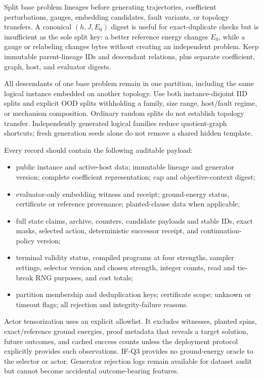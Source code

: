 \documentclass[11pt,a4paper]{article}
\theoremstyle{definition}\newtheorem{definition}[proposition]{Definition}
\begin{document}
Split base problem lineages before generating trajectories, coefficient perturbations, gauges, embedding candidates, fault variants, or topology transfers. A canonical $(h,J,E_0)$ digest is useful for exact-duplicate checks but is insufficient as the sole split key: a better reference energy changes $E_0$, while a gauge or relabeling changes bytes without creating an independent problem. Keep immutable parent-lineage IDs and descendant relations, plus separate coefficient, graph, host, and evaluator digests.

All descendants of one base problem remain in one partition, including the same logical instance embedded on another topology. Use both instance-disjoint IID splits and explicit OOD splits withholding a family, size range, host/fault regime, or mechanism composition. Ordinary random splits do not establish topology transfer. Independently generated logical families reduce quotient-graph shortcuts; fresh generation seeds alone do not remove a shared hidden template.

Every record should contain the following auditable payload:
\begin{itemize}
 \item public instance and active-host data; immutable lineage and generator version; complete coefficient representation; cap and objective-context digest;
 \item evaluator-only embedding witness and receipt; ground-energy status, certificate or reference provenance; planted-clause data when applicable;
 \item full state claims, archive, counters, candidate payloads and stable IDs, exact masks, selected action, deterministic successor receipt, and continuation-policy version;
 \item terminal validity status, compiled programs at four strengths, sampler settings, selector version and chosen strength, integer counts, read and tie-break RNG purposes, and cost totals;
 \item partition membership and deduplication keys; certificate scope; unknown or timeout flags; all rejection and integrity-failure reasons.
\end{itemize}
Actor tensorization uses an explicit allowlist. It excludes witnesses, planted spins, exact/reference ground energies, proof metadata that reveals a target solution, future outcomes, and cached success counts unless the deployment protocol explicitly provides such observations. IF-Q3 provides no ground-energy oracle to the selector or actor. Generator rejection logs remain available for dataset audit but cannot become accidental outcome-bearing features.
\end{document}
